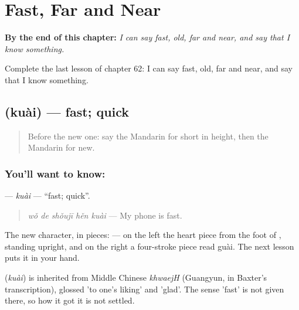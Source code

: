 
\chapter{Fast, Far and Near}
\label{ch:zh-fast-far-and-near}

\begin{chapteropening}
\textbf{By the end of this chapter:} \emph{I can say fast, old, far and near, and say that I know something.}

Complete the last lesson of chapter 62: I can say fast, old, far and near, and say that I know something.
\end{chapteropening}

\section[\texorpdfstring{\zh{快} (kuài)}{快 (kuài)}]{ (kuài) — fast; quick}

\label{lesson:ZH-C62-kuai}



\begin{quote}
Before the new one: say the Mandarin for short in height, then the Mandarin for new.
\end{quote}

\subsection*{You'll want to know: }
\textbf{} — \emph{kuài} — \textquotedblleft{}fast; quick\textquotedblright{}.

\begin{quote}
\textbf{} \emph{wǒ de shǒujī hěn kuài} — My phone is fast.
\end{quote}

The new character, in pieces:  — on the left the heart piece from the foot of , standing upright, and on the right a four-stroke piece read guài. The next lesson puts it in your hand.

\begin{cousinweb}
\textbf{} (\emph{kuài}) is inherited from Middle Chinese \emph{khwaejH} (Guangyun, in Baxter's transcription), glossed 'to one's liking' and 'glad'. The sense 'fast' is not given there, so how it got it is not settled.
\end{cousinweb}

